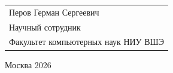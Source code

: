 \begin{titlepage}
{
\begin{tabular}{l}
Перов Герман Сергеевич\\
Научный сотрудник\\
Факультет компьютерных наук НИУ ВШЭ 
\end{tabular}}





\vspace{\fill}

\begin{center}
Москва 2026
\end{center}

\end{titlepage}